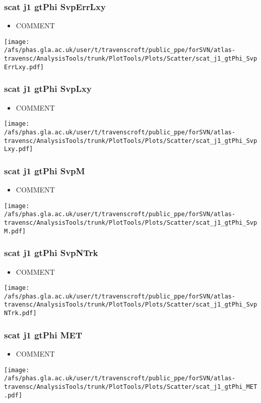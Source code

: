\documentclass{beamer}
\begin{document}
\begin{frame}
\frametitle{scat j1 gtPhi SvpErrLxy}
\begin{itemize}
\item COMMENT
\end{itemize}
\begin{center}
\texttt{[image: /afs/phas.gla.ac.uk/user/t/travenscroft/public\_ppe/forSVN/atlas-travensc/AnalysisTools/trunk/PlotTools/Plots/Scatter/scat\_j1\_gtPhi\_SvpErrLxy.pdf]}
\end{center}
\end{frame}

\begin{frame}
\frametitle{scat j1 gtPhi SvpLxy}
\begin{itemize}
\item COMMENT
\end{itemize}
\begin{center}
\texttt{[image: /afs/phas.gla.ac.uk/user/t/travenscroft/public\_ppe/forSVN/atlas-travensc/AnalysisTools/trunk/PlotTools/Plots/Scatter/scat\_j1\_gtPhi\_SvpLxy.pdf]}
\end{center}
\end{frame}

\begin{frame}
\frametitle{scat j1 gtPhi SvpM}
\begin{itemize}
\item COMMENT
\end{itemize}
\begin{center}
\texttt{[image: /afs/phas.gla.ac.uk/user/t/travenscroft/public\_ppe/forSVN/atlas-travensc/AnalysisTools/trunk/PlotTools/Plots/Scatter/scat\_j1\_gtPhi\_SvpM.pdf]}
\end{center}
\end{frame}

\begin{frame}
\frametitle{scat j1 gtPhi SvpNTrk}
\begin{itemize}
\item COMMENT
\end{itemize}
\begin{center}
\texttt{[image: /afs/phas.gla.ac.uk/user/t/travenscroft/public\_ppe/forSVN/atlas-travensc/AnalysisTools/trunk/PlotTools/Plots/Scatter/scat\_j1\_gtPhi\_SvpNTrk.pdf]}
\end{center}
\end{frame}

\begin{frame}
\frametitle{scat j1 gtPhi MET}
\begin{itemize}
\item COMMENT
\end{itemize}
\begin{center}
\texttt{[image: /afs/phas.gla.ac.uk/user/t/travenscroft/public\_ppe/forSVN/atlas-travensc/AnalysisTools/trunk/PlotTools/Plots/Scatter/scat\_j1\_gtPhi\_MET.pdf]}
\end{center}
\end{frame}
\end{document}
